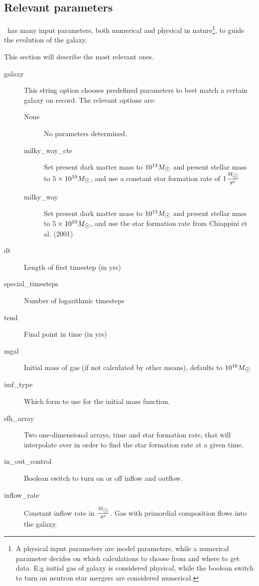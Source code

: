 \subsection{Relevant parameters}
\label{sec:omega-parameters}
\omegamodel\ has many input parameters, both numerical and physical in nature\footnote{A physical input parameters are model parameters, while a numerical parameter decides on which calculations to choose from and where to get data. E.g initial gas of galaxy is considered physical, while the boolean switch to turn on neutron star mergers are considered numerical.}, to guide the evolution of the galaxy.

This section will describe the most relevant ones.

\begin{description}
\item[galaxy]
  This string option chooses predefined parameters to best match a certain galaxy on record.
  The relevant options are:
  \begin{description}
  \item[None] No parameters determined.
  \item[milky\_way\_cte] Set present dark matter mass to $10^{12} \msol$ and present stellar mass to $5\times10^{10} \msol$, and use a constant star formation rate of $1 \frac{\msol}{yr}$
  \item[milky\_way] Set present dark matter mass to $10^{12} \msol$ and present stellar mass to $5\times10^{10} \msol$, and use the star formation rate from Chiappini et al. (2001) 
  \end{description}
\item[dt] Length of first timestep (in yrs)
\item[special\_timesteps] Number of logarithmic timesteps
\item[tend] Final point in time (in yrs)
\item[mgal] Initial mass of gas (if not calculated by other means), defaults to $10^{10} \msol$
\item[imf\_type] Which form to use for the initial mass function. 
\item[sfh\_array] Two one-dimensional arrays, time and star formation rate, that \omegamodel will interpolate over in order to find the star formation rate at a given time.
\item[in\_out\_control] Boolean switch to turn on or off inflow and outflow.
\item[inflow\_rate] Constant inflow rate in $\frac{\msol}{yr}$. Gas with primordial composition  flows into the galaxy.

\end{description}
